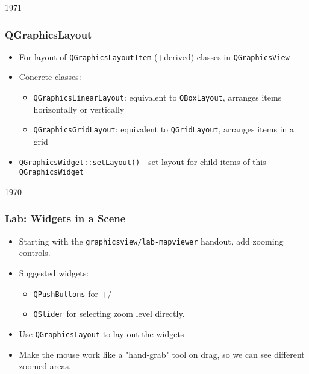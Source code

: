 \begin{slide}{1971}
\frametitle{QGraphicsLayout}

\begin{itemize}

\item For layout of \texttt{QGraphicsLayoutItem} (+derived) classes in \texttt{QGraphicsView}
\item Concrete classes:
    \begin{itemize}
    \item \texttt{QGraphicsLinearLayout}: equivalent to \texttt{QBoxLayout}, arranges items horizontally or vertically
    \item \texttt{QGraphicsGridLayout}: equivalent to \texttt{QGridLayout}, arranges items in a grid
    \end{itemize}
\item \texttt{QGraphicsWidget::setLayout()} - set layout for child items of this \texttt{QGraphicsWidget}
\end{itemize}

\end{slide}

\begin{slide}{1970}
\frametitle{Lab: Widgets in a Scene}
\begin{itemize}
\item Starting with the \texttt{graphicsview/lab-mapviewer} handout, add zooming controls.
\item Suggested widgets:
    \begin{itemize}
    \item \texttt{QPushButtons} for +/-
    \item \texttt{QSlider} for selecting zoom level directly. 
    \end{itemize}
\item Use \texttt{QGraphicsLayout} to lay out the widgets
\item Make the mouse work like a "hand-grab" tool on drag, so we can see different zoomed areas. 
\end{itemize}
\end{slide}


